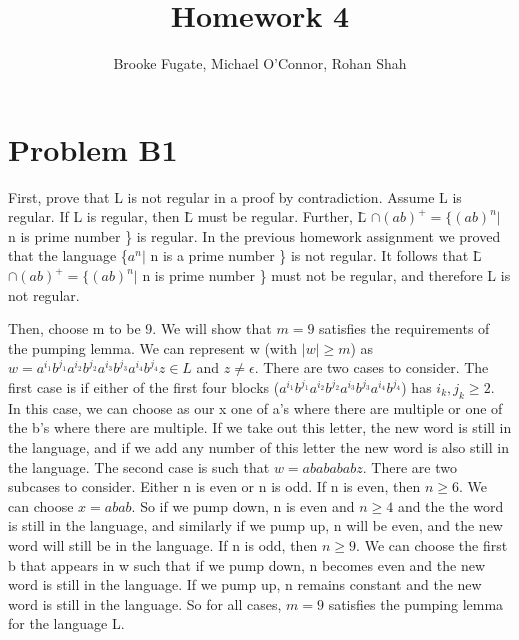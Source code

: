 \documentclass[12pt]{article}
\begin{document}
\pagestyle{plain}
\titleformat{\subsection}[runin]
  {\normalfont\large\bfseries}{\thesubsection}{1em}{}

\title{Homework 4}
\author{Brooke Fugate, Michael O'Connor, Rohan Shah}
\date{}

\maketitle

\section*{Problem B1}
First, prove that L is not regular in a proof by contradiction. Assume L is regular. 
If L is regular, then \={L} must be regular. Further, \={L} $\cap (ab)^+ = \{(ab)^n |$ n is prime number \}
is regular. In the previous homework assignment we proved that the language \{$a^n |$ n is a prime number \}
is not regular. It follows that \={L} $\cap (ab)^+ = \{(ab)^n |$ n is prime number \} must not be regular, 
and therefore L is not regular.

\medskip

Then, choose m to be 9. We will show that $m=9$ satisfies the requirements of the pumping lemma.
We can represent w (with $|w| \ge m$) as $w=a^{i_1}b^{j_1}a^{i_2}b^{j_2}a^{i_3}b^{j_3}a^{i_4}b^{j_4}z \in L$
and $z \neq \epsilon$. 
There are two cases to consider. The first case is if either of the first four blocks 
($a^{i_1}b^{j_1}a^{i_2}b^{j_2}a^{i_3}b^{j_3}a^{i_4}b^{j_4}$) has $i_k,j_k \ge 2$. In this case,
we can choose as our x one of a's where there are multiple or one of the b's where there are multiple.
If we take out this letter, the new word is still in the language, and if we add any number of this letter
the new word is also 
still in the language. The second case is such that $w=ababababz$. There are two subcases to 
consider. Either n is even or n is odd. If n is even, then $n \ge 6$. We can choose $x=abab$. 
So if we pump down, n is even and $n \ge 4$ and the the word is still in the language, 
and similarly if we pump up, n will be even, and the new word will still be in the language.
If n is odd, then $n \ge 9$. We can choose the first b that appears in w such that if we pump down,
n becomes even and the new word is still in the language. If we pump up, n remains constant 
and the new word is still in the language. So for all cases, $m=9$ satisfies the pumping lemma
for the language L.
\end{document}

